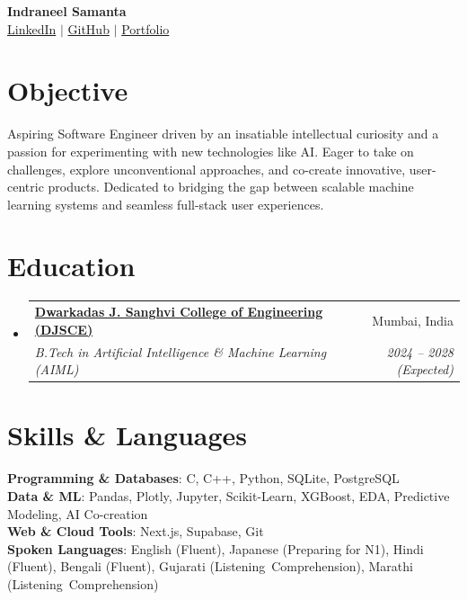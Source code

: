 \documentclass[letterpaper,10pt]{article}
\makeatletter
\newcommand{\resumeSubheading}[4]{
  \item
    \begin{tabular*}{0.98\textwidth}[t]{l@{\extracolsep{\fill}}r}
      \textbf{#1} & \small#2 \\
      \textit{\small#3} & \textit{\small #4} \\
    \end{tabular*}\vspace{1pt}
}
\newcommand{\resumeSubHeadingListStart}{\begin{itemize}[leftmargin=0.12in, label={}, itemsep=4pt, parsep=0pt, topsep=2pt]}
\newcommand{\resumeSubHeadingListEnd}{\end{itemize}}
\makeatother
\begin{document}
\begin{center}
    \textbf{\Huge Indraneel Samanta} \\ \vspace{3pt}
    \small \href{https://linkedin.com/in/indraneel-samanta}{LinkedIn} $|$
    \href{https://github.com/NotCatfish}{GitHub} $|$
    \href{https://indraneelsamanta.vercel.app/}{Portfolio}
\end{center}
\vspace{-6pt}

\section{Objective}
  \small{Aspiring Software Engineer driven by an insatiable intellectual curiosity and a passion for experimenting with new technologies like AI. Eager to take on challenges, explore unconventional approaches, and co-create innovative, user-centric products. Dedicated to bridging the gap between scalable machine learning systems and seamless full-stack user experiences.}
\vspace{2pt}

\section{Education}
  \resumeSubHeadingListStart
    \resumeSubheading
      {\href{https://www.djsce.ac.in/}{Dwarkadas J. Sanghvi College of Engineering (DJSCE)}}{Mumbai, India}
      {B.Tech in Artificial Intelligence \& Machine Learning (AIML)}{2024 -- 2028 (Expected)}
  \resumeSubHeadingListEnd

\section{Skills \& Languages}
 \begin{itemize}[leftmargin=0.12in, label={}, itemsep=4pt, parsep=0pt, topsep=4pt]
    \small{\item{
     \textbf{Programming \& Databases}{: C, C++, Python, SQLite, PostgreSQL} \\[2pt]
     \textbf{Data \& ML}{: Pandas, Plotly, Jupyter, Scikit-Learn, XGBoost, EDA, Predictive Modeling, AI Co-creation} \\[2pt]
     \textbf{Web \& Cloud Tools}{: Next.js, Supabase, Git} \\[2pt]
     \textbf{Spoken Languages}{: English (Fluent), Japanese (Preparing for N1), Hindi (Fluent), Bengali (Fluent), Gujarati (Listening~Comprehension), Marathi (Listening~Comprehension)}
    }}
 \end{itemize}
\end{document}

